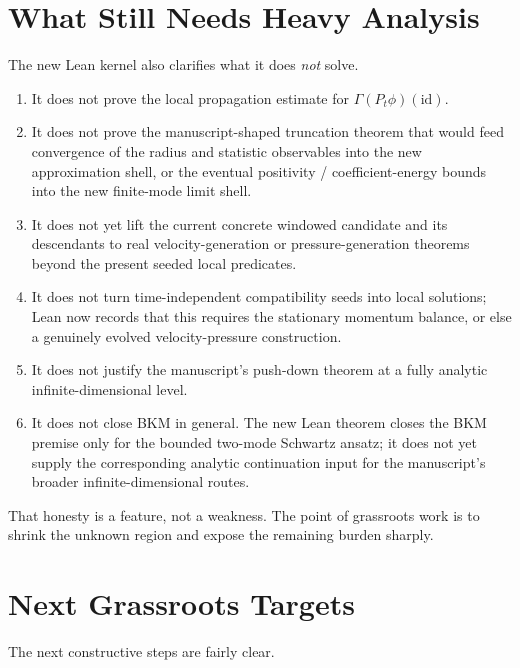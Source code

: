 \documentclass[11pt]{article}
\theoremstyle{remark}
\begin{document}
\section{What Still Needs Heavy Analysis}

The new Lean kernel also clarifies what it does \emph{not} solve.

\begin{enumerate}[leftmargin=1.5em]
  \item It does not prove the local propagation estimate for
  \(\Gamma(P_t \phi)(\mathrm{id})\).
  \item It does not prove the manuscript-shaped truncation theorem that would
  feed convergence of the radius and statistic observables into the new
  approximation shell, or the eventual positivity / coefficient-energy bounds
  into the new finite-mode limit shell.
  \item It does not yet lift the current concrete windowed candidate and its
  descendants to real velocity-generation or pressure-generation theorems
  beyond the present seeded local predicates.
  \item It does not turn time-independent compatibility seeds into local
  solutions; Lean now records that this requires the stationary momentum
  balance, or else a genuinely evolved velocity-pressure construction.
  \item It does not justify the manuscript's push-down theorem at a fully
  analytic infinite-dimensional level.
  \item It does not close BKM in general.  The new Lean theorem closes the BKM
  premise only for the bounded two-mode Schwartz ansatz; it does not yet supply
  the corresponding analytic continuation input for the manuscript's broader
  infinite-dimensional routes.
\end{enumerate}

That honesty is a feature, not a weakness.  The point of grassroots work is to
shrink the unknown region and expose the remaining burden sharply.

\section{Next Grassroots Targets}

The next constructive steps are fairly clear.
\end{document}
